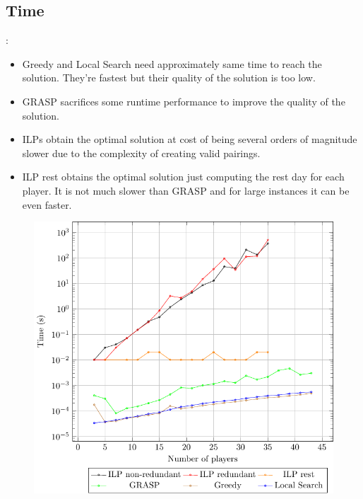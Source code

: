 \documentclass[9pt, aspectratio=169, xcolor=table]{beamer}
\begin{document}
\subsection{Time}
\begin{frame}{\secname: \subsecname}
    \begin{minipage}{0.44\textwidth}
	\begin{itemize}
	    \item Greedy and Local Search need approximately same time to reach the solution. They're fastest but their quality of the solution is too low.
	    \item GRASP sacrifices some runtime performance to improve the quality of the solution.
      \item ILPs obtain the optimal solution at cost of being several orders of magnitude slower due to the complexity of creating valid pairings.
      \item ILP rest obtains the optimal solution just computing the rest day for each player. It is not much slower than GRASP and for large instances it can be even faster.
	\end{itemize}
    \end{minipage}
    \hfill
    \begin{minipage}{0.52\textwidth}
	\centering
	\begin{figure}[H]
	    \centering
	    \includegraphics[width=\linewidth]{../plots/times.pdf}
	\end{figure}
    \end{minipage}
\end{frame}
\end{document}
